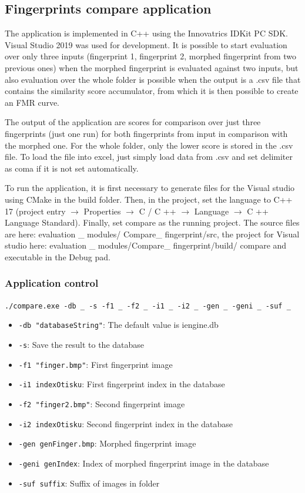 \label{fca}
\subsection{Fingerprints compare application} 
The application is implemented in C++ using the Innovatrics IDKit PC SDK. Visual Studio 2019 was used for development. It is possible to start evaluation over only three inputs (fingerprint 1, fingerprint 2, morphed fingerprint from two previous ones) when the morphed fingerprint is evaluated against two inputs, but also evaluation over the whole folder is possible when the output is a .csv file that contains the similarity score accumulator, from which it is then possible to create an FMR curve. 

The output of the application are scores for comparison over just three fingerprints (just one run) for both fingerprints from input in comparison with the morphed one. For the whole folder, only the lower score is stored in the .csv file. To load the file into excel, just simply load data from .csv and set delimiter as coma if it is not set automatically.

To run the application, it is first necessary to generate files for the Visual studio using CMake in the build folder. Then, in the project, set the language to C++ 17 (project entry $ \rightarrow $ Properties $ \rightarrow $ C / C ++ $ \rightarrow $ Language $ \rightarrow $ C ++ Language Standard). Finally, set compare as the running project. The source files are here: evaluation \_ modules/ Compare\_ fingerprint/src, the project for Visual studio here: evaluation \_ modules/Compare\_ fingerprint/build/ compare and executable in the Debug pad.

\subsubsection{Application control}
\texttt{./compare.exe -db \_ -s -f1 \_ -f2 \_ -i1 \_ -i2 \_ -gen \_ -geni \_ -suf \_}
\begin{itemize}
    \item \texttt{-db "databaseString"}: The default value is iengine.db 
    \item \texttt{-s}: Save the result to the database
    \item \texttt{-f1 "finger.bmp"}: First fingerprint image
    \item \texttt{-i1 indexOtisku}: First fingerprint index in the database
    \item \texttt{-f2 "finger2.bmp"}: Second fingerprint image
    \item \texttt{-i2 indexOtisku}: Second fingerprint index in the database
    \item \texttt{-gen genFinger.bmp}: Morphed fingerprint image
    \item \texttt{-geni genIndex}: Index of morphed fingerprint image in the database 
    \item \texttt{-suf suffix}: Suffix of images in folder
\end{itemize}

